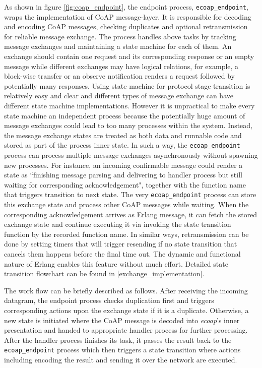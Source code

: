 As shown in figure \ref{fig:coap_endpoint}, the endpoint process, \verb|ecoap_endpoint|, wraps the implementation of CoAP message-layer. It is responsible for decoding and encoding CoAP messages, checking duplicates and optional retransmission for reliable message exchange. The process handles above tasks by tracking message exchanges and maintaining a state machine for each of them. An exchange should contain one request and its corresponding response or an empty message while different exchanges may have logical relations, for example, a block-wise transfer or an observe notification renders a request followed by potentially many responses. Using state machine for protocol stage transition is relatively easy and clear and different types of message exchange can have different state machine implementations. However it is unpractical to make every state machine an independent process because the potentially huge amount of message exchanges could lead to too many processes within the system. Instead, the message exchange states are treated as both data and runnable code and stored as part of the process inner state. In such a way, the \verb|ecoap_endpoint| process can process multiple message exchanges asynchronously without spawning new processes. For instance, an incoming confirmable message could render a state as ``finishing message parsing and delivering to handler process but still waiting for corresponding acknowledgement", together with the function name that triggers transition to next state. The very \verb|ecoap_endpoint| process can store this exchange state and process other CoAP messages while waiting. When the corresponding acknowledgement arrives as Erlang message, it can fetch the stored exchange state and continue executing it via invoking the state transition function by the recorded function name. In similar ways, retransmission can be done by setting timers that will trigger resending if no state transition that cancels them happens before the final time out. The dynamic and functional nature of Erlang enables this feature without much effort. Detailed state transition flowchart can be found in \ref{exchange_implementation}.

The work flow can be briefly described as follows. After receiving the incoming datagram, the endpoint process checks duplication first and triggers corresponding actions upon the exchange state if it is a duplicate. Otherwise, a new state is initiated where the CoAP message is decoded into \textit{ecoap}'s inner presentation and handed to appropriate handler process for further processing. After the handler process finishes its task, it passes the result back to the \verb|ecoap_endpoint| process which then  triggers a state transition where actions including encoding the result and sending it over the network are executed.

